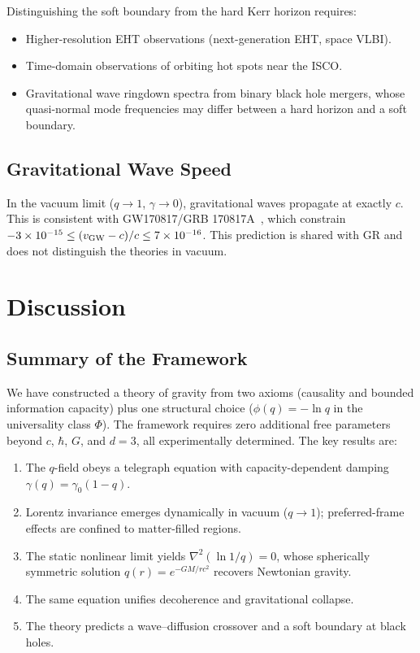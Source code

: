 \documentclass[aps,prd,twocolumn,showpacs,superscriptaddress,preprintnumbers]{revtex4-2}
\begin{document}
Distinguishing the soft boundary from the hard Kerr horizon requires:
\begin{itemize}
    \item Higher-resolution EHT observations (next-generation EHT, space VLBI).
    \item Time-domain observations of orbiting hot spots near the ISCO.
    \item Gravitational wave ringdown spectra from binary black hole mergers, whose quasi-normal mode frequencies may differ between a hard horizon and a soft boundary.
\end{itemize}

\subsection{Gravitational Wave Speed}

In the vacuum limit ($q\to1$, $\gamma\to0$), gravitational waves propagate at exactly $c$.
This is consistent with GW170817/GRB 170817A~\cite{Abbott:2017apx,GW170817grb}, which constrain $-3\times10^{-15}\leq(v_{\rm GW}-c)/c\leq7\times10^{-16}$.
This prediction is shared with GR and does not distinguish the theories in vacuum.

\section{Discussion}
\label{sec:discussion}

\subsection{Summary of the Framework}

We have constructed a theory of gravity from two axioms (causality and bounded information capacity) plus one structural choice ($\phi(q)=-\ln q$ in the universality class $\Phi$).
The framework requires zero additional free parameters beyond $c$, $\hbar$, $G$, and $d=3$, all experimentally determined.
The key results are:

\begin{enumerate}
    \item The $q$-field obeys a telegraph equation with capacity-dependent damping $\gamma(q)=\gamma_0(1-q)$.
    \item Lorentz invariance emerges dynamically in vacuum ($q\to1$); preferred-frame effects are confined to matter-filled regions.
    \item The static nonlinear limit yields $\nabla^2(\ln 1/q)=0$, whose spherically symmetric solution $q(r)=e^{-GM/rc^2}$ recovers Newtonian gravity.
    \item The same equation unifies decoherence and gravitational collapse.
    \item The theory predicts a wave--diffusion crossover and a soft boundary at black holes.
\end{enumerate}
\end{document}
